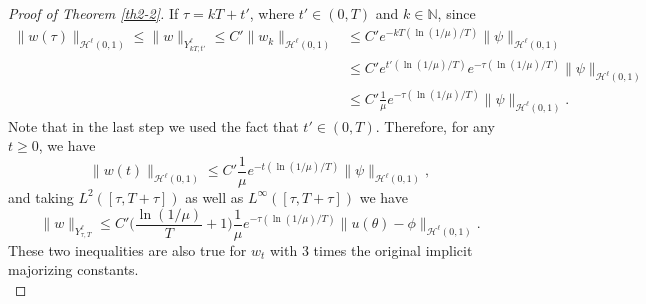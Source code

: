 \documentclass[10pt,a4paper,final]{article}
\numberwithin{equation}{section}
\newcommand{\N}{\mathbb{N}}
\newcommand{\cH}{\mathcal{H}}
\begin{document}
\begin{proof}[Proof of Theorem \ref{th2-2}]
If $\tau=kT+t'$, where $t'\in(0,T)$ and $k\in \N$, since 
\begin{align*}
   \|w(\tau)\|_{\cH^{\ell}(0,1)}\leq \|w\|_{Y^{\ell}_{kT,t'}} \leq C'\|w_{k}\|_{\cH^{\ell}(0,1)}&\leq C' e^{-kT(\ln(1/\mu)/T)}\|\psi\|_{\cH^{\ell}(0,1)}\\
   &\leq C'e^{t'(\ln(1/\mu)/T)}e^{-\tau(\ln(1/\mu)/T)}\|\psi\|_{\cH^{\ell}(0,1)}\\
    &\leq C'\frac{1}{\mu}e^{-\tau(\ln(1/\mu)/T)}\|\psi\|_{\cH^{\ell}(0,1)}.
\end{align*}
Note that in the last step we used the fact that $t'\in (0,T)$.
Therefore, for any $t\geq 0$, we have 
$$\|w(t)\|_{\cH^{\ell}(0,1)}\leq C'\frac{1}{\mu}e^{-t(\ln(1/\mu)/T)}\|\psi\|_{\cH^{\ell}(0,1)},$$
and 
taking $L^2([\tau,T+\tau])$ as well as $L^{\infty}([\tau,T+\tau])$ we have 
$$\|w\|_{Y^{\ell}_{\tau,T}}\leq C'\bigg(\frac{\ln(1/\mu)}{T}+1\bigg)\frac{1}{\mu}e^{-\tau(\ln(1/\mu)/T)}\|u(\theta)-\phi\|_{\cH^{\ell}(0,1)}.$$
These two inequalities are also true for $w_t$ with 3 times the original implicit majorizing constants.\\


\end{proof}
\end{document}
